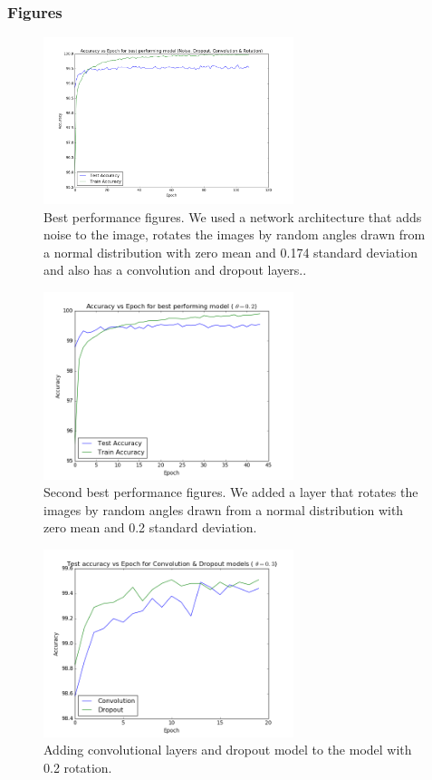 \documentclass{article}
\begin{document}
\subsubsection{Figures}
\begin{figure}[ht!]
  \centering
  \includegraphics[width=0.65\textwidth]{topperformance}
  \caption{Best performance figures. We used a network architecture that adds noise to the image, rotates the images by random angles drawn from a normal distribution with zero mean and 0.174 standard deviation and also has a convolution and dropout layers..\label{fig:top_performance}}
\end{figure}
\begin{figure}[ht!]
  \centering
  \includegraphics[width=0.65\textwidth]{bestPerformance}
  \caption{Second best performance figures. We added a layer that rotates the images by random angles drawn from a normal distribution with zero mean and 0.2 standard deviation. \label{fig:best_performance}}
\end{figure}
\begin{figure}[ht!]
  \centering
  \includegraphics[width=0.65\textwidth]{convolution_dropout}
  \caption{Adding convolutional layers and dropout model to the model with 0.2 rotation. \label{fig:convolution_dropout}}
\end{figure}
\end{document}

